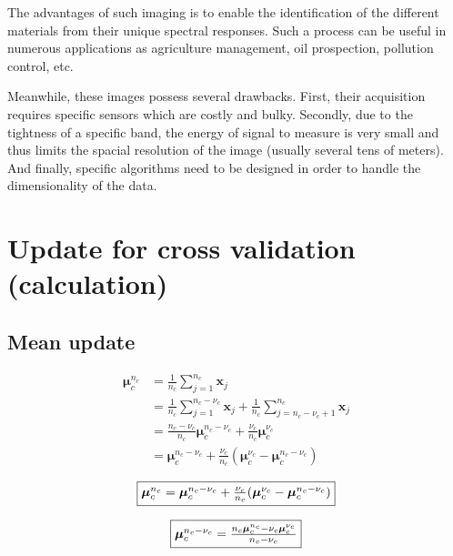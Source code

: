 \documentclass[a4paper,11pt,DIV=16,abstracton]{scrartcl}
\begin{document}
The advantages of such imaging is to enable the identification of the different materials from their unique spectral responses. Such a process can be useful in numerous applications as agriculture management, oil prospection, pollution control, etc.

Meanwhile, these images possess several drawbacks. First, their acquisition requires specific sensors which are costly and bulky. Secondly, due to the tightness of a specific band, the energy of signal to measure is very small and thus limits the spacial resolution of the image (usually several tens of meters). And finally, specific algorithms need to be designed in order to handle the dimensionality of the data.


\section{Update for cross validation (calculation)}
\label{app:cv_maj}

    \subsection{Mean update}
        \begin{align*}
            \boldsymbol{\mu}_c^{n_c} &= \frac{1}{n_c} \sum_{j = 1}^{n_c} \mathbf{x}_j \\
                        &= \frac{1}{n_c} \sum_{j = 1}^{n_c-\nu_c} \mathbf{x}_j + \frac{1}{n_c} \sum_{j = n_c-\nu_c +1}^{n_c} \mathbf{x}_j \\
                        &= \frac{n_c-\nu_c}{n_c} \boldsymbol{\mu}_c^{n_c-\nu_c} + \frac{\nu_c}{n_c} \boldsymbol{\mu}_c^{\nu_c} \\
                        &= \boldsymbol{\mu}_c^{n_c-\nu_c} + \frac{\nu_c}{n_c} (\boldsymbol{\mu}_c^{\nu_c} - \boldsymbol{\mu}_c^{n_c-\nu_c})
        \end{align*}

        \begin{equation}
             \fbox{$\boldsymbol{\mu}_c^{n_c} = \boldsymbol{\mu}_c^{n_c-\nu_c} + \frac{\nu_c}{n_c} (\boldsymbol{\mu}_c^{\nu_c} - \boldsymbol{\mu}_c^{n_c-\nu_c})$}
        \end{equation}

        \begin{equation}
            \fbox{$\boldsymbol{\mu}_c^{n_c-\nu_c} = \frac{n_c \boldsymbol{\mu}_c^{n_c} - \nu_c \boldsymbol{\mu}_c^{\nu_c}}{n_c - \nu_c}$}
        \end{equation}
\end{document}
